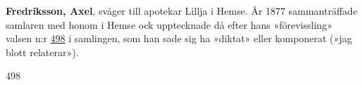 \textbf{Fredriksson, Axel}, svåger till apotekar Lillja i Hemse. År 1877 sammanträffade
samlaren med honom i Hemse ock upptecknade då efter hans »förevissling» valsen n:r
\href{498}{498} i samlingen, som han sade sig ha »diktat» eller komponerat
(»jag blott relaterar»).

498